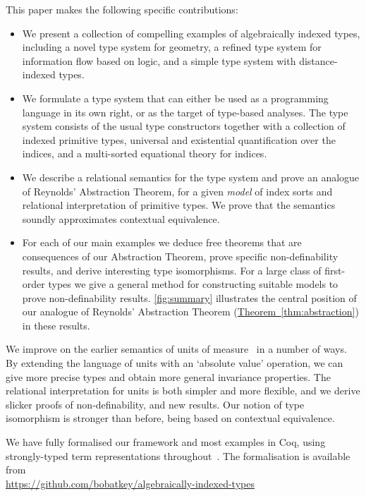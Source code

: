 \documentclass{sigplanconf}
\newcommand{\thmref}[1]{\hyperref[#1]{Theorem~\ref*{#1}}}
\theoremstyle{examplestyle}
\theoremstyle{restatementstyle}
\begin{document}
This paper makes the following specific contributions:
\begin{itemize}
\item 
We present a collection of compelling examples of algebraically
indexed types, including a novel type system for geometry, a
refined type system for information flow based on logic, and a simple
type system with distance-indexed types.
\item 
We formulate a type system that can either be used as a programming
language in its own right, or as the target of type-based
analyses. The type system consists of the usual type constructors
together with a collection of indexed primitive types, universal and
existential quantification over the indices, and a multi-sorted
equational theory for indices.
\item
We describe a relational semantics for the type system and prove an
analogue of Reynolds' Abstraction Theorem, for a given \emph{model}
of index sorts and relational interpretation of primitive types.
We prove that the semantics soundly approximates contextual equivalence.
\item
For each of our main examples we deduce free theorems that are
consequences of our Abstraction Theorem, prove specific non-definability
results, and derive interesting type isomorphisms. 
For a large class of first-order types we give a general method for 
constructing suitable models to prove non-definability results. 
\autoref{fig:summary}
illustrates the central position of our analogue of Reynolds' Abstraction
Theorem (\thmref{thm:abstraction}) in these results.
\end{itemize}
We improve on the earlier semantics of
units of measure~\cite{kennedy97relational} in a number of ways.  By
extending the language of units with an `absolute value' operation, we
can give more precise types and obtain more general invariance
properties.  The relational interpretation for units is both simpler
and more flexible, and we derive slicker proofs of non-definability,
and new results.  Our notion of type isomorphism is stronger than
before, being based on contextual equivalence.

We have fully formalised our framework and most examples in Coq,
using strongly-typed term representations
throughout~\cite{TypedSyntax}. The formalisation is available from
\\{\small \url{https://github.com/bobatkey/algebraically-indexed-types}}
\end{document}
